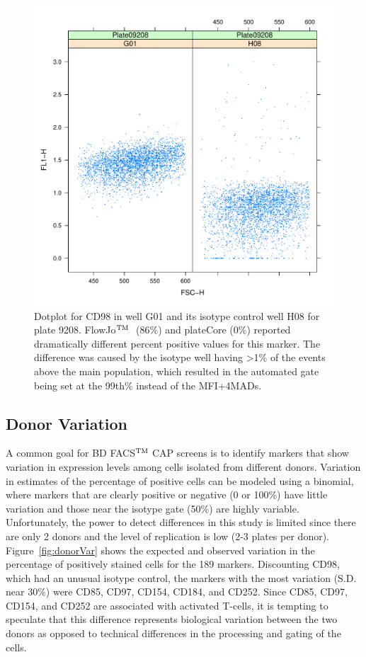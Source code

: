 \documentclass[12pt]{article}
\def\tm{$^{\rm \text{TM }}$}
\begin{document}
\clearpage
\begin{figure}
\centering
\includegraphics{fjVSr2.pdf}
\caption{Dotplot for CD98 in well G01 and its isotype control well H08 for plate 9208. FlowJo\tm
(86\%) and plateCore (0\%) reported dramatically different percent positive values for this marker. The 
difference was caused by the isotype well having >1\% of the events above the main population, which
resulted in the automated gate being set at the 99th\% instead of the MFI+4MADs.}
\label{fig:disagree}
\end{figure}


\clearpage
\subsection*{Donor Variation}

A common goal for BD FACS\tm CAP screens is to identify markers that show variation in expression levels
among cells isolated from different donors. Variation in estimates of the percentage of positive cells can
be modeled using a binomial, where markers that are clearly positive or negative (0 or 100\%) have little
variation and those near the isotype gate (50\%) are highly variable.
Unfortunately, the power to detect differences in this study is limited
since there are only 2 donors and the level of replication is low (2-3 plates per donor).
Figure~\ref{fig:donorVar} shows  the expected and observed variation in the percentage of
positively stained cells for the 189 markers. Discounting CD98, which had an unusual isotype control, the
markers with the most variation (S.D. near 30\%) were CD85, CD97, CD154, CD184, and CD252. Since CD85, CD97, CD154, and 
CD252 are associated with activated T-cells, it is tempting to speculate that this difference represents
biological variation between the two donors as opposed to technical differences in the processing and gating
of the cells.
\end{document}
